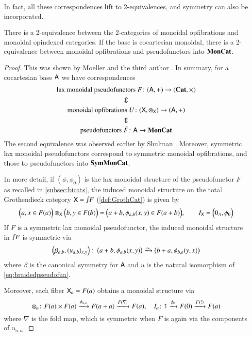 \documentclass[reqno]{amsart}
\begin{document}
In fact, all these correspondences lift to 2-equivalences, and symmetry can also be incorporated.

\begin{lem}\label{lem:MonGroth}
There is a 2-equivalence between the 2-categories of monoidal opfibrations and monoidal opindexed categories. If the base is cocartesian monoidal, there is a 2-equivalence between monoidal opfibrations and pseudofunctors into $\mathbf{MonCat}$. 
\end{lem}

\begin{proof}
This was shown by Moeller and the third author \cite[Theorems~3.13\&4.2]{MV}. In summary, for a cocartesian base $\mathsf{A}$ we have correspondences
\begin{gather}
\textrm{lax monoidal pseudofunctors }F\colon(\mathsf{A},+)\to(\mathbf{Cat},\times) \notag\\
\Updownarrow \notag\\
\textrm{monoidal opfibrations }U\colon(\mathsf{X},\otimes_{\mathsf{X}})\to(\mathsf{A},+) \notag\\
\Updownarrow \notag\\
\textrm{pseudofunctors } \tilde{F} \colon \mathsf{A}\to \mathbf{MonCat} \notag
\end{gather}
The second equivalence was observed earlier by Shulman \cite{Shulman2008}. Moreover, symmetric lax monoidal pseudofunctors correspond to symmetric monoidal opfibrations, and those to pseudofunctors into $\mathbf{SymMonCat}$.

In more detail, if $(\phi,\phi_0)$ is the lax monoidal structure of the pseudofunctor $F$ as recalled in \cref{subsec:bicats}, the induced monoidal structure on the total Grothendieck category $\X=\inta F$ (\cref{def:GrothCat}) is given by
\begin{equation}\label{eq:explicitstructure2}
\Big(a,x\in F(a)\Big)\otimes_{\mathsf{X}}\Big(b,y\in F(b)\Big)=\Big(a+b,\phi_{a,b}(x,y)\in F(a+b)\Big), \qquad I_{\mathsf{X}}=\Big(0_A,\phi_0\Big)
\end{equation}
If $F$ is a symmetric lax monoidal pseudofunctor, the induced monoidal structure in $\inta F$ is symmetric via
$$\left(\beta_{a,b},(u_{a,b})_{x,y}\right)\colon \left(a+b,\phi_{a,b}(x,y)\right)\simrightarrow\left(b+a,\phi_{b,a}(y,x)\right)$$ where $\beta$ is the canonical symmetry for $\mathsf{A}$ and $u$ is the natural isomorphism of \cref{eq:braidedpseudofun}.

Moreover, each fiber $\mathsf{X}_a=F(a)$ obtains a monoidal structure via 
\begin{equation}\label{eq:explicitstructure1}
\otimes_a\colon F(a)\times F(a)\xrightarrow{\phi_{a,a}}F(a+a)\xrightarrow{F(\nabla)}F(a),\quad
I_a\colon\mathsf{1}\xrightarrow{\phi_0}F(0)\xrightarrow{F(!)}F(a)
\end{equation}
where $\nabla$ is the fold map, which is symmetric when $F$ is again via the components of $u_{a,a}$.
\end{proof}
\end{document}
